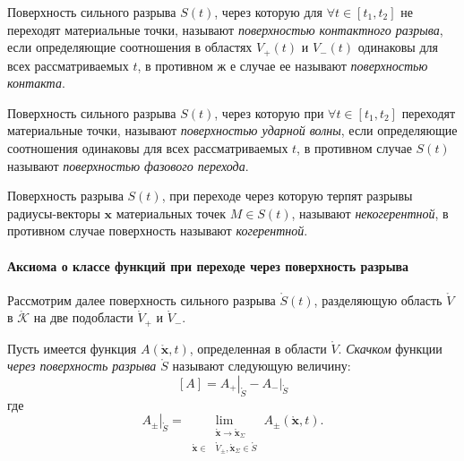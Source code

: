 \begin{definition}
	Поверхность сильного разрыва $S(t)$, через которую для $\forall t\in [t_1,t_2]$ не переходят материальные точки, называют
	\textit{поверхностью контактного разрыва}, если определяющие соотношения в областях $V_+(t)$ и $V_-(t)$ одинаковы для всех рассматриваемых $t$, в противном ж е случае ее называют \textit{поверхностью контакта}.
\end{definition}
\begin{definition}
	Поверхность сильного разрыва $S(t)$, через которую при
	$\forall t\in [t_1,t_2]$ переходят материальные точки, называют \textit{поверхностью ударной волны}, если определяющие соотношения одинаковы для всех рассматриваемых $t$, в противном случае $S(t)$ называют \textit{поверхностью фазового перехода}.
\end{definition}

\begin{definition}
	Поверхность разрыва $S(t)$, при переходе через которую
	терпят разрывы радиусы-векторы $\mathbf{x}$ материальных точек $M \in S(t)$, называют \textit{некогерентной}, в противном случае поверхность называют \textit{когерентной}.
\end{definition}

\paragraph{Аксиома о классе функций при переходе через поверхность разрыва}
Рассмотрим далее поверхность сильного разрыва $\mathring{S}(t)$, разделяющую область $\mathring{V}$ в $\mathring{\mathcal{K}}$ на две подобласти $\mathring{V}_+$ и $\mathring{V}_-$.

\begin{definition}
	Пусть имеется функция $A(\mathring{\mathbf{x}},t)$, определенная в области $\mathring{V}$. \textit{Скачком} функции \textit{через поверхность разрыва $\mathring{S}$} называют следующую величину:
	\[
	[A]=\left.A_+\right|_{\mathring{S}}-\left.A_-\right|_{\mathring{S}}
	\]
	где
	\[
	\left.A_{\pm}\right|_{\mathring{S}}=\lim_{
		\begin{aligned}
			&\mathring{\mathbf{x}}\to\mathring{\mathbf{x}}_\Sigma\\
			\mathring{\mathbf{x}}\in&\mathring{V}_{\pm},\mathring{\mathbf{x}}_\Sigma\in\mathring{S}
	\end{aligned}}A_{\pm}(\mathring{\mathbf{x}},t).
	\]
\end{definition}

